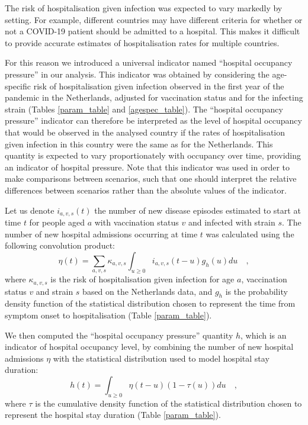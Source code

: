 The risk of hospitalisation given infection was expected to vary markedly by setting.
For example, different countries may have different criteria for whether or not a COVID-19 
patient should be admitted to a hospital. This makes it difficult to provide accurate 
estimates of hospitalisation rates for multiple countries. 

For this reason we introduced a universal indicator named ``hospital occupancy pressure'' in our analysis. This indicator
was obtained by considering the age-specific risk of hospitalisation given infection observed in the first year
of the pandemic in the Netherlands, adjusted for vaccination status and for the infecting strain (Tables \ref{param_table} and \ref{agespec_table}).
The ``hospital occupancy pressure'' indicator can therefore be interpreted as the level of hospital occupancy that
would be observed in the analysed country if the rates of hospitalisation given infection in this country were the same
as for the Netherlands. This quantity is expected to vary proportionately with occupancy over time, providing an indicator of 
hospital pressure. Note that this indicator was used in order to make comparisons between scenarios, such that one should interpret the relative
differences between scenarios rather than the absolute values of the indicator. 

Let us denote $i_{a,v,s}(t)$ the number of new disease episodes estimated to start at time $t$ for people aged $a$ with vaccination status $v$
and infected with strain $s$. The number of new hospital admissions occurring at time $t$ was calculated using the following
convolution product:
\begin{equation}
 \eta(t) = \sum_{a,v,s} \kappa_{a,v,s} \int_{u \geq 0}  i_{a,v,s}(t-u)g_{h}(u) du   \quad,
 \end{equation}
where $\kappa_{a,v,s}$ is the risk of hospitalisation given infection for age $a$, vaccination status $v$ and strain $s$ 
based on the Netherlands data, and $g_h$ is the probability density function of the statistical distribution chosen to represent the 
time from symptom onset to hospitalisation (Table \ref{param_table}). 

We then computed the ``hospital occupancy pressure'' quantity $h$, which is an indicator of hospital occupancy level, by combining the number of new 
hospital admissions $\eta$ with the statistical distribution used to model hospital stay duration:
\begin{equation}
h(t) = \int_{u \geq 0}  \eta(t-u) (1 - \tau(u)) du   \quad,
\end{equation}
where $\tau$ is the cumulative density function of the statistical distribution chosen to represent the 
hospital stay duration (Table \ref{param_table}). 
